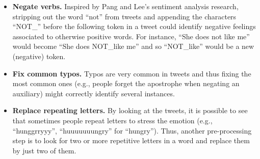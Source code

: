 \begin{itemize}
\item \textbf{Negate verbs.} Inspired by Pang and Lee's sentiment analysis research\cite{not_paper}, stripping out the word ``not'' from tweets and appending the characters “NOT\_” before the following token in a tweet could identify negative feelings associated to otherwise positive words. For instance, ``She does not like me'' would become ``She does NOT\_like me'' and so ``NOT\_like'' would be a new (negative) token.
\item \textbf{Fix common typos.} Typos are very common in tweets and thus fixing the most common ones (e.g., people forget the apostrophe when negating an auxiliary) might correctly identify several instances.
\item \textbf{Replace repeating letters.} By looking at the tweets, it is possible to see that sometimes people repeat letters to stress the emotion (e.g., ``hunggrryyy'', ``huuuuuuungry'' for ``hungry''). Thus, another pre-processing step is to look for two or more repetitive letters in a word and replace them by just two of them.
\end{itemize}